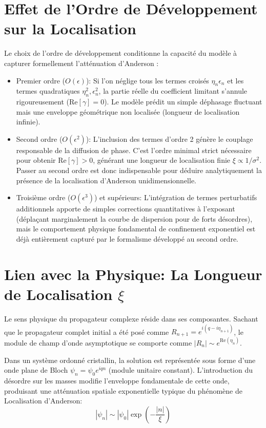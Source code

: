 \section{Effet de l'Ordre de Développement sur la Localisation}
Le choix de l'ordre de développement conditionne la capacité du modèle à capturer formellement l'atténuation d'Anderson :
\begin{itemize}
    \item Premier ordre ($O(\epsilon)$): Si l'on néglige tous les termes croisés $\eta_n \epsilon_n$ et les termes quadratiques $\eta_n^2, \epsilon_n^2$, la partie réelle du coefficient limitant s'annule rigoureusement ($\text{Re}[\gamma] = 0$). Le modèle prédit un simple déphasage fluctuant mais une enveloppe géométrique non localisée (longueur de localisation infinie).
    \item Second ordre ($O(\epsilon^2)$): L'inclusion des termes d'ordre 2 génère le couplage responsable de la diffusion de phase. C'est l'ordre minimal strict nécessaire pour obtenir $\text{Re}[\gamma] > 0$, générant une longueur de localisation finie $\xi \propto 1/\sigma^2$. Passer au second ordre est donc indispensable pour déduire analytiquement la présence de la localisation d'Anderson unidimensionnelle.
    \item Troisième ordre ($O(\epsilon^3)$) et supérieurs: L'intégration de termes perturbatifs additionnels apporte de simples corrections quantitatives à l'exposant (déplaçant marginalement la courbe de dispersion pour de forts désordres), mais le comportement physique fondamental de confinement exponentiel est déjà entièrement capturé par le formalisme développé au second ordre.
\end{itemize}

\section[Lien avec la Physique: La Longueur de Localisation xi]{Lien avec la Physique: La Longueur de Localisation $\xi$}
Le sens physique du propagateur complexe réside dans ses composantes. Sachant que le propagateur complet initial a été posé comme $R_{n+1} = e^{i(q - i\eta_{n+1})}$, le module de champ d'onde asymptotique se comporte comme $|R_n| \sim e^{\text{Re}(\eta_n)}$.

Dans un système ordonné cristallin, la solution est représentée sous forme d'une onde plane de Bloch $\psi_n = \psi_0 e^{iqn}$ (module unitaire constant). L'introduction du désordre sur les masses modifie l'enveloppe fondamentale de cette onde, produisant une atténuation spatiale exponentielle typique du phénomène de Localisation d'Anderson:
\begin{equation}
    |\psi_n| \sim |\psi_0| \exp \left( - \frac{|n|}{\xi} \right)
\end{equation}

